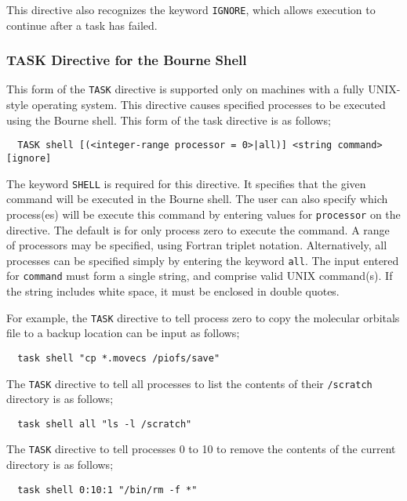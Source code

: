 This directive also recognizes the keyword \verb+IGNORE+, which allows
execution to continue after a task has failed.

\subsubsection{TASK Directive for the Bourne Shell}

This form of the \verb+TASK+ directive is supported only on machines
with a fully UNIX-style operating system.  This directive causes
specified processes to be executed using the Bourne shell.  This form
of the task directive is as follows;

\begin{verbatim}
  TASK shell [(<integer-range processor = 0>|all)] <string command> [ignore]
\end{verbatim}

The keyword \verb+SHELL+ is required for this directive.  It specifies
that the given command will be executed in the Bourne shell.  The user
can also specify which process(es) will be execute this command by
entering values for \verb+processor+ on the directive.  The default is
for only process zero to execute the command.  A range of processors
may be specified, using Fortran triplet notation.  Alternatively, all
processes can be specified simply by entering the keyword \verb+all+.
The input entered for \verb+command+ must form a single string, and
comprise valid UNIX command(s).  If the string includes white space,
it must be enclosed in double quotes.

For example, the \verb+TASK+ directive to tell process zero to copy the 
molecular orbitals file to a backup location can be input as follows;

\begin{verbatim}
  task shell "cp *.movecs /piofs/save"
\end{verbatim}

The \verb+TASK+ directive to tell all processes to list the contents of 
their \verb+/scratch+ directory is as follows;

\begin{verbatim}
  task shell all "ls -l /scratch"
\end{verbatim}

The \verb+TASK+ directive to tell processes 0 to 10 to remove the 
contents of the current directory is as follows;

\begin{verbatim}
  task shell 0:10:1 "/bin/rm -f *"
\end{verbatim}

